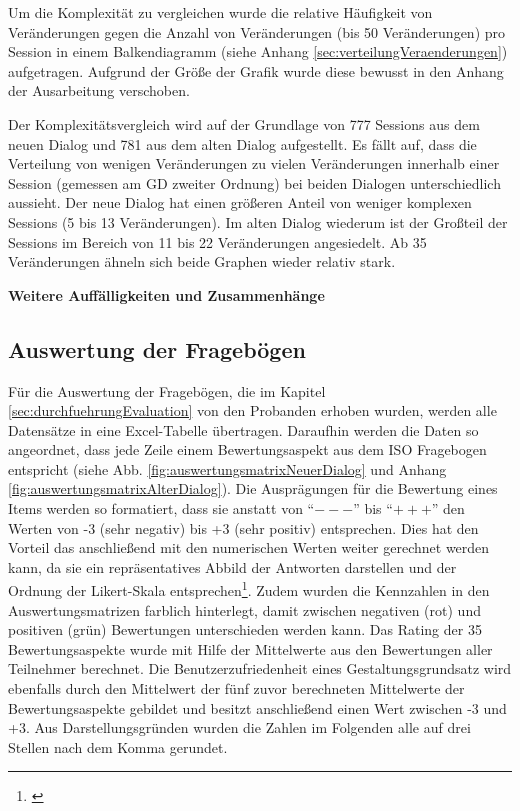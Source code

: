 Um die Komplexität zu vergleichen wurde die relative Häufigkeit von Veränderungen gegen die Anzahl von Veränderungen (bis 50 Veränderungen) pro Session in einem Balkendiagramm (siehe Anhang \ref{sec:verteilungVeraenderungen}) aufgetragen. Aufgrund der Größe der Grafik wurde diese bewusst in den Anhang der Ausarbeitung verschoben. 

Der Komplexitätsvergleich wird auf der Grundlage von 777 Sessions aus dem neuen Dialog und 781 aus dem alten Dialog aufgestellt. Es fällt auf, dass die Verteilung von wenigen Veränderungen zu vielen Veränderungen innerhalb einer Session (gemessen am GD zweiter Ordnung) bei beiden Dialogen unterschiedlich aussieht. Der neue Dialog hat einen größeren Anteil von weniger komplexen Sessions (5 bis 13 Veränderungen). Im alten Dialog wiederum ist der Großteil der Sessions im Bereich von 11 bis 22 Veränderungen angesiedelt. Ab 35 Veränderungen ähneln sich beide Graphen wieder relativ stark. 


\textbf{Weitere Auffälligkeiten und Zusammenhänge}

\subsection{Auswertung der Fragebögen}
\label{sec:auswertungDerFrageboegen}
Für die Auswertung der Fragebögen, die im Kapitel \ref{sec:durchfuehrungEvaluation} von den Probanden erhoben wurden, werden alle Datensätze in eine Excel-Tabelle übertragen. Daraufhin werden die Daten so angeordnet, dass jede Zeile einem Bewertungsaspekt aus dem ISO Fragebogen entspricht (siehe Abb. \ref{fig:auswertungsmatrixNeuerDialog} und Anhang \ref{fig:auswertungsmatrixAlterDialog}). Die Ausprägungen für die Bewertung eines Items werden so formatiert, dass sie anstatt von \enquote{$---$} bis \enquote{$+++$} den Werten von -3 (sehr negativ) bis +3 (sehr positiv) entsprechen. Dies hat den Vorteil das anschließend mit den numerischen Werten weiter gerechnet werden kann, da sie ein repräsentatives Abbild der Antworten darstellen und der Ordnung der Likert-Skala entsprechen\footnote{\cite[vgl.][]{Statista}}. Zudem wurden die Kennzahlen in den Auswertungsmatrizen farblich hinterlegt, damit zwischen negativen (rot) und positiven (grün) Bewertungen unterschieden werden kann. Das Rating der 35 Bewertungsaspekte wurde mit Hilfe der Mittelwerte aus den Bewertungen aller Teilnehmer berechnet. Die Benutzerzufriedenheit eines Gestaltungsgrundsatz wird ebenfalls durch den Mittelwert der fünf zuvor berechneten Mittelwerte der Bewertungsaspekte gebildet und besitzt anschließend einen Wert zwischen -3 und +3. Aus Darstellungsgründen wurden die Zahlen im Folgenden alle auf drei Stellen nach dem Komma gerundet.

